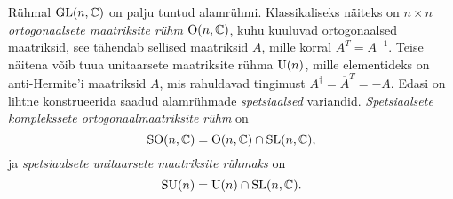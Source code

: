 Rühmal $\operatorname{GL}(n, \mathbb{C})$ on palju tuntud alamrühmi. Klassikaliseks näiteks on
$n \times n$ \emph{ortogonaalsete maatriksite rühm} $\operatorname{O}(n, \mathbb{C})$, kuhu kuuluvad
ortogonaalsed maatriksid, see tähendab sellised maatriksid $A$, mille korral
$A^T = A^{-1}$. Teise näitena võib tuua unitaarsete maatriksite rühma $\operatorname{U}(n)$,
mille elementideks on anti-Hermite'i maatriksid $A$, mis rahuldavad tingimust
$A^\dag = \overline{A}^T = -A$. Edasi on lihtne konstrueerida saadud alamrühmade
\emph{spetsiaalsed} variandid. \emph{Spetsiaalsete komplekssete ortogonaalmaatriksite rühm} on
\[ \operatorname{SO}(n, \mathbb{C}) = \operatorname{O}(n, \mathbb{C}) \cap \operatorname{SL}(n, \mathbb{C}), \]
ja \emph{spetsiaalsete unitaarsete maatriksite rühmaks} on
\[ \operatorname{SU}(n) = \operatorname{U}(n) \cap \operatorname{SL}(n, \mathbb{C}). \]
